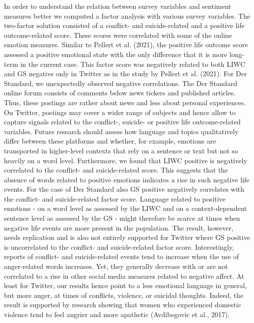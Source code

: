 \documentclass[
  english,
  jou,floatsintext]{apa7}
\begin{document}
In order to understand the relation between survey variables and sentiment measures better we computed a factor analysis with various survey variables. The two-factor solution consisted of a conflict- and suicide-related and a positive life outcome-related score. These scores were correlated with some of the online emotion measures. Similar to Pellert et al. (2021), the positive life outcome score assessed a positive emotional state with the only difference that it is more long-term in the current case. This factor score was negatively related to both LIWC and GS negative only in Twitter as in the study by Pellert et al. (2021). For Der Standard, we unexpectedly observed negative correlations. The Der Standard online forum consists of comments below news tickers and published articles. Thus, these postings are rather about news and less about personal experiences. On Twitter, postings may cover a wider range of subjects and hence allow to capture signals related to the conflict-, suicide- or positive life outcome-related variables.
Future research should assess how language and topics qualitatively differ between these platforms and whether, for example, emotions are transported in higher-level contexts that rely on a sentence or text but not so heavily on a word level.
Furthermore, we found that LIWC positive is negatively correlated to the conflict- and suicide-related score. This suggests that the absence of words related to positive emotions indicates a rise in such negative life events. For the case of Der Standard also GS positive negatively correlates with the conflict- and suicide-related factor score. Language related to positive emotions - on a word level as assessed by the LIWC and on a context-dependent sentence level as assessed by the GS - might therefore be scarce at times when negative life events are more present in the population. The result, however, needs replication and is also not entirely supported for Twitter where GS positive is uncorrelated to the conflict- and suicide-related factor score.
Interestingly, reports of conflict- and suicide-related events tend to increase when the use of anger-related words increases. Yet, they generally decrease with or are not correlated to a rise in other social media measures related to negative affect. At least for Twitter, our results hence point to a less emotional language in general, but more anger, at times of conflicts, violence, or suicidal thoughts. Indeed, the result is supported by research showing that women who experienced domestic violence tend to feel angrier and more apathetic (Avdibegovic et al., 2017).
\end{document}
